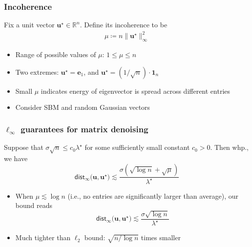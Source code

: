 \documentclass[compress,
mathserif,wide,%
]{beamer}
\begin{document}
\begin{frame}
	\frametitle{Incoherence}
	\begin{definition}
	Fix a unit vector $\bm{u}^\star \in \mathbb{R}^{n}$. Define its incoherence to be
	\begin{align*}
	\mu \coloneqq {n\|\bm{u}^{\star}\|_{\infty}^{2}} 
\end{align*}
\end{definition}

\vfill
\begin{itemize}
	\item Range of possible values of $\mu$: $1 \leq \mu \leq n$
	\item Two extremes: $\bm{u}^\star = \bm{e}_{1}$, and $\bm{u}^\star = (1 / \sqrt{n}) \cdot \bm{1}_{n}$
	\item Small $\mu$ indicates energy of eigenvector is spread across different entries
	\item Consider SBM and random Gaussian vectors
\end{itemize}

\end{frame}

\begin{frame}
	\frametitle{$\ell_{\infty}$ guarantees for matrix denoising}
	\begin{theorem}\label{thm:denoising-inf}
		Suppose that $\sigma \sqrt{n} \leq c_0 \lambda^\star$ for some sufficiently small constant $c_0 > 0$. Then whp., we have 
		\[
		\mathsf{dist}_{\infty} \big(\bm{u},\bm{u}^{\star}\big) \lesssim \frac{\sigma (\sqrt{\log n} + \sqrt{\mu} ) }{ \lambda^\star }
		\]
	\end{theorem}
	
	\begin{itemize}
		\item When $\mu \lesssim \log n$ (i.e., no entries are significantly larger than average), our bound reads
		\[
		\mathsf{dist}_{\infty} \big(\bm{u},\bm{u}^{\star}\big) \lesssim \frac{\sigma \sqrt{\log n} }{ \lambda^\star }
		\]
		\item Much tighter than $\ell_{2}$ bound: $\sqrt{ n / \log n}$ times smaller
	\end{itemize}
\end{frame}
\end{document}
